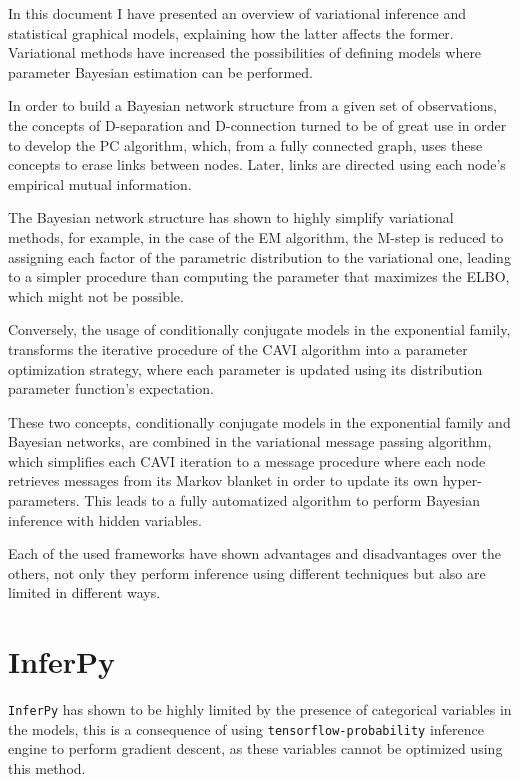 

In this document I have presented an overview of variational inference and statistical graphical models, explaining how the latter affects the former. Variational methods have increased the possibilities of defining models where parameter Bayesian estimation can be performed.

In order to build a Bayesian network structure from a given set of observations, the concepts of D-separation and D-connection turned to be of great use in order to develop the PC algorithm, which, from a fully connected graph, uses these concepts to erase links between nodes. Later, links are directed using each node's empirical mutual information.

The Bayesian network structure has shown to highly simplify variational methods, for example, in the case of the EM algorithm, the M-step is reduced to assigning each factor of the parametric distribution to the variational one, leading to a simpler procedure than computing the parameter that maximizes the ELBO, which might not be possible.

Conversely, the usage of conditionally conjugate models in the exponential family, transforms the iterative procedure of the CAVI algorithm into a parameter optimization strategy, where each parameter is updated using its distribution parameter function's expectation.

These two concepts, conditionally conjugate models in the exponential family and Bayesian networks, are combined in the variational message passing algorithm, which simplifies each CAVI iteration to a message procedure where each node retrieves messages from its Markov blanket in order to update its own hyper-parameters. This leads to a fully automatized algorithm to perform Bayesian inference with hidden variables.

Each of the used frameworks have shown advantages and disadvantages over the others, not only they perform inference using different techniques but also are limited in different ways.

\section*{InferPy}
\texttt{InferPy} has shown to be highly limited by the presence of categorical variables in the models, this is a consequence of using \texttt{tensorflow-probability} inference engine to perform gradient descent, as these variables cannot be optimized using this method.

